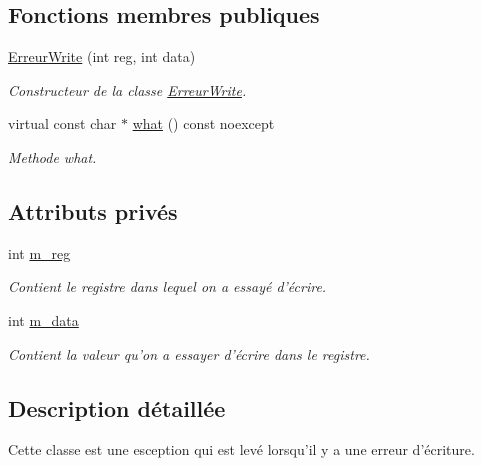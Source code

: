 \subsection*{Fonctions membres publiques}
\begin{DoxyCompactItemize}
\item 
\hyperlink{classCI2C_1_1ErreurWrite_a8d3b2f6b46d6bb5e4b26e5fdce8e80b4}{Erreur\+Write} (int reg, int data)
\begin{DoxyCompactList}\small\item\em Constructeur de la classe \hyperlink{classCI2C_1_1ErreurWrite}{Erreur\+Write}. \end{DoxyCompactList}\item 
virtual const char $\ast$ \hyperlink{classCI2C_1_1ErreurWrite_ad76aa069d233146923c4a244d2da9665}{what} () const noexcept
\begin{DoxyCompactList}\small\item\em Methode what. \end{DoxyCompactList}\end{DoxyCompactItemize}
\subsection*{Attributs privés}
\begin{DoxyCompactItemize}
\item 
\hypertarget{classCI2C_1_1ErreurWrite_a0271678b0343dd18ad8113ab3dd579d2}{int \hyperlink{classCI2C_1_1ErreurWrite_a0271678b0343dd18ad8113ab3dd579d2}{m\+\_\+reg}}\label{classCI2C_1_1ErreurWrite_a0271678b0343dd18ad8113ab3dd579d2}

\begin{DoxyCompactList}\small\item\em Contient le registre dans lequel on a essayé d'écrire. \end{DoxyCompactList}\item 
\hypertarget{classCI2C_1_1ErreurWrite_a3ba1d239d00892177274b494e987862b}{int \hyperlink{classCI2C_1_1ErreurWrite_a3ba1d239d00892177274b494e987862b}{m\+\_\+data}}\label{classCI2C_1_1ErreurWrite_a3ba1d239d00892177274b494e987862b}

\begin{DoxyCompactList}\small\item\em Contient la valeur qu'on a essayer d'écrire dans le registre. \end{DoxyCompactList}\end{DoxyCompactItemize}


\subsection{Description détaillée}
Cette classe est une esception qui est levé lorsqu'il y a une erreur d'écriture. 

